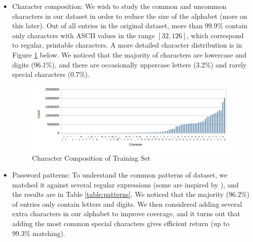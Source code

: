 \documentclass{article} %
\theoremstyle{definition}
\theoremstyle{theorem}
\theoremstyle{remark}
\theoremstyle{remark}
\begin{document}
\begin{itemize}
    \item Character composition: We wish to study the common and uncommon characters in our dataset in order to reduce the size of the alphabet (more on this later). Out of all entries in the original dataset, more than 99.9\% contain only characters with ASCII values in the range $[32,126]$, which correspond to regular, printable characters. A more detailed character distribution is in Figure \ref{fig:chardistribution} below. We noticed that the majority of characters are lowercase and digits (96.1\%), and there are occasionally uppercase letters (3.2\%) and rarely special characters (0.7\%). 
    
    \begin{figure}[!htbp]
        \begin{center}
            \includegraphics[width=\textwidth]{diag/chardistribution.png}
        \end{center}
        \vspace{-15pt}
        \caption{Character Composition of Training Set}
        \label{fig:chardistribution}
    \end{figure}
    
    \item Password patterns: To understand the common patterns of dataset, we matched it against several regular expressions (some are inspired by \cite{empirical}), and the results are in Table \ref{table:patterns}. We noticed that the majority ($96.2\%$) of entries only contain letters and digits. We then considered adding several extra characters in our alphabet to improve coverage, and it turns out that adding the most common special characters gives efficient return (up to $99.3\%$ matching).
    

\end{itemize}
\end{document}
